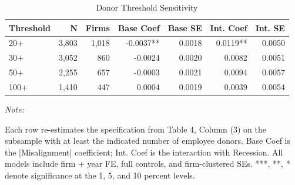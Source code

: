 \documentclass[
  10pt,
]{article}
\begin{document}
\newpage

\begin{table}[!h]
\centering
\caption{\label{tab:table5}Donor Threshold Sensitivity}
\centering
\fontsize{9}{11}\selectfont
\begin{threeparttable}
\begin{tabular}[t]{lrrrrrr}
\toprule
Threshold & N & Firms & Base Coef & Base SE & Int. Coef & Int. SE\\
\midrule
20+ & 3,803 & 1,018 & -0.0037** & 0.0018 & 0.0119** & 0.0050\\
30+ & 3,052 & 860 & -0.0024 & 0.0020 & 0.0082 & 0.0051\\
50+ & 2,255 & 657 & -0.0003 & 0.0021 & 0.0094 & 0.0057\\
100+ & 1,410 & 447 & 0.0004 & 0.0019 & 0.0039 & 0.0054\\
\bottomrule
\end{tabular}
\begin{tablenotes}[para]
\item \textit{Note: } 
\item Each row re-estimates the specification from Table 4, Column (3) on the subsample with at least the indicated number of employee donors. Base Coef is the |Misalignment| coefficient; Int. Coef is the interaction with Recession. All models include firm + year FE, full controls, and firm-clustered SEs. ***, **, * denote significance at the 1, 5, and 10 percent levels.
\end{tablenotes}
\end{threeparttable}
\end{table}

\newpage
\end{document}
